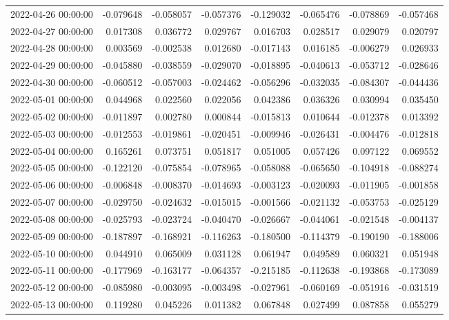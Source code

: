 \begin{tabular}{lrrrrrrr}
2022-04-26 00:00:00 & -0.079648 & -0.058057 & -0.057376 & -0.129032 & -0.065476 & -0.078869 & -0.057468 \\
2022-04-27 00:00:00 & 0.017308 & 0.036772 & 0.029767 & 0.016703 & 0.028517 & 0.029079 & 0.020797 \\
2022-04-28 00:00:00 & 0.003569 & -0.002538 & 0.012680 & -0.017143 & 0.016185 & -0.006279 & 0.026933 \\
2022-04-29 00:00:00 & -0.045880 & -0.038559 & -0.029070 & -0.018895 & -0.040613 & -0.053712 & -0.028646 \\
2022-04-30 00:00:00 & -0.060512 & -0.057003 & -0.024462 & -0.056296 & -0.032035 & -0.084307 & -0.044436 \\
2022-05-01 00:00:00 & 0.044968 & 0.022560 & 0.022056 & 0.042386 & 0.036326 & 0.030994 & 0.035450 \\
2022-05-02 00:00:00 & -0.011897 & 0.002780 & 0.000844 & -0.015813 & 0.010644 & -0.012378 & 0.013392 \\
2022-05-03 00:00:00 & -0.012553 & -0.019861 & -0.020451 & -0.009946 & -0.026431 & -0.004476 & -0.012818 \\
2022-05-04 00:00:00 & 0.165261 & 0.073751 & 0.051817 & 0.051005 & 0.057426 & 0.097122 & 0.069552 \\
2022-05-05 00:00:00 & -0.122120 & -0.075854 & -0.078965 & -0.058088 & -0.065650 & -0.104918 & -0.088274 \\
2022-05-06 00:00:00 & -0.006848 & -0.008370 & -0.014693 & -0.003123 & -0.020093 & -0.011905 & -0.001858 \\
2022-05-07 00:00:00 & -0.029750 & -0.024632 & -0.015015 & -0.001566 & -0.021132 & -0.053753 & -0.025129 \\
2022-05-08 00:00:00 & -0.025793 & -0.023724 & -0.040470 & -0.026667 & -0.044061 & -0.021548 & -0.004137 \\
2022-05-09 00:00:00 & -0.187897 & -0.168921 & -0.116263 & -0.180500 & -0.114379 & -0.190190 & -0.188006 \\
2022-05-10 00:00:00 & 0.044910 & 0.065009 & 0.031128 & 0.061947 & 0.049589 & 0.060321 & 0.051948 \\
2022-05-11 00:00:00 & -0.177969 & -0.163177 & -0.064357 & -0.215185 & -0.112638 & -0.193868 & -0.173089 \\
2022-05-12 00:00:00 & -0.085980 & -0.003095 & -0.003498 & -0.027961 & -0.060169 & -0.051916 & -0.031519 \\
2022-05-13 00:00:00 & 0.119280 & 0.045226 & 0.011382 & 0.067848 & 0.027499 & 0.087858 & 0.055279 \\

\end{tabular}
